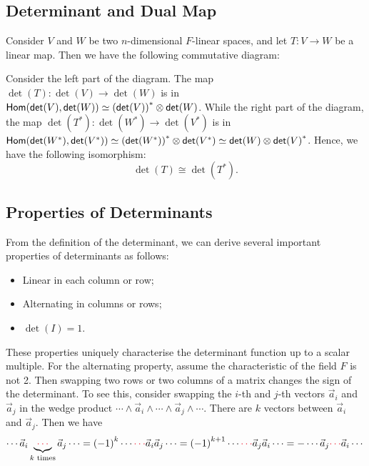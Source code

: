 \subsection{Determinant and Dual Map}
Consider $V$ and $W$ be two $n$-dimensional $F$-linear spaces, and let $T \colon V \to W$ be a linear map. Then we have the following commutative diagram:
\begin{center}
\end{center}
Consider the left part of the diagram. The map $\det(T) \colon \det(V) \to \det(W)$ is in $\operatorname{\text{\normalfont\sffamily Hom}}(\operatorname{\text{\normalfont\sffamily det}}(V), \operatorname{\text{\normalfont\sffamily det}}(W)) \simeq {(\operatorname{\text{\normalfont\sffamily det}}(V))}^* \otimes \operatorname{\text{\normalfont\sffamily det}}(W)$. While the right part of the diagram, the map $\det(T^*) \colon \det(W^*) \to \det(V^*)$ is in $\operatorname{\text{\normalfont\sffamily Hom}}(\operatorname{\text{\normalfont\sffamily det}}(W^*), \operatorname{\text{\normalfont\sffamily det}}(V^*)) \simeq {(\operatorname{\text{\normalfont\sffamily det}}(W^*))}^* \otimes \operatorname{\text{\normalfont\sffamily det}}(V^*) \simeq \operatorname{\text{\normalfont\sffamily det}}(W) \otimes {\operatorname{\text{\normalfont\sffamily det}}(V)}^*$. Hence, we have the following isomorphism:
\[
  \det(T) \cong \det(T^*).
\]

\subsection{Properties of Determinants}
From the definition of the determinant, we can derive several important properties of determinants as follows:
\begin{itemize}
  \item Linear in each column or row;
  \item Alternating in columns or rows;
  \item $\det(I) = 1$.
\end{itemize}
These properties uniquely characterise the determinant function up to a scalar multiple. For the alternating property, assume the characteristic of the field $F$ is not 2. Then swapping two rows or two columns of a matrix changes the sign of the determinant. To see this, consider swapping the $i$-th and $j$-th vectors $\vec{a}_i$ and $\vec{a}_j$ in the wedge product $\cdots \wedge \vec{a}_i \wedge \cdots \wedge \vec{a}_j \wedge \cdots$. There are $k$ vectors between $\vec{a}_i$ and $\vec{a}_j$. Then we have
\[
  \cdots \vec{a}_i \underbrace{\color{ustred} \cdots}_{k \text{ times}} \vec{a}_j \cdots = {(-1)}^k \cdots {\color{ustred} \cdots} \vec{a}_i \vec{a}_j \cdots = {(-1)}^{k + 1} \cdots {\color{ustred} \cdots} \vec{a}_j \vec{a}_i \cdots = - \cdots \vec{a}_j {\color{ustred} \cdots} \vec{a}_i \cdots
\]

